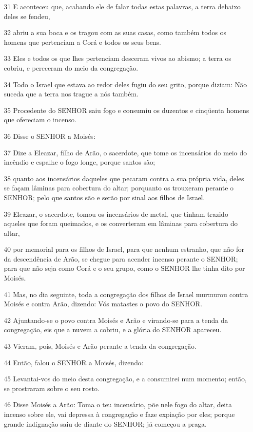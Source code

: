 \par 31 E aconteceu que, acabando ele de falar todas estas palavras, a terra debaixo deles se fendeu,
\par 32 abriu a sua boca e os tragou com as suas casas, como também todos os homens que pertenciam a Corá e todos os seus bens.
\par 33 Eles e todos os que lhes pertenciam desceram vivos ao abismo; a terra os cobriu, e pereceram do meio da congregação.
\par 34 Todo o Israel que estava ao redor deles fugiu do seu grito, porque diziam: Não suceda que a terra nos trague a nós também.
\par 35 Procedente do SENHOR saiu fogo e consumiu os duzentos e cinqüenta homens que ofereciam o incenso.
\par 36 Disse o SENHOR a Moisés:
\par 37 Dize a Eleazar, filho de Arão, o sacerdote, que tome os incensários do meio do incêndio e espalhe o fogo longe, porque santos são;
\par 38 quanto aos incensários daqueles que pecaram contra a sua própria vida, deles se façam lâminas para cobertura do altar; porquanto os trouxeram perante o SENHOR; pelo que santos são e serão por sinal aos filhos de Israel.
\par 39 Eleazar, o sacerdote, tomou os incensários de metal, que tinham trazido aqueles que foram queimados, e os converteram em lâminas para cobertura do altar,
\par 40 por memorial para os filhos de Israel, para que nenhum estranho, que não for da descendência de Arão, se chegue para acender incenso perante o SENHOR; para que não seja como Corá e o seu grupo, como o SENHOR lhe tinha dito por Moisés.
\par 41 Mas, no dia seguinte, toda a congregação dos filhos de Israel murmurou contra Moisés e contra Arão, dizendo: Vós matastes o povo do SENHOR.
\par 42 Ajuntando-se o povo contra Moisés e Arão e virando-se para a tenda da congregação, eis que a nuvem a cobriu, e a glória do SENHOR apareceu.
\par 43 Vieram, pois, Moisés e Arão perante a tenda da congregação.
\par 44 Então, falou o SENHOR a Moisés, dizendo:
\par 45 Levantai-vos do meio desta congregação, e a consumirei num momento; então, se prostraram sobre o seu rosto.
\par 46 Disse Moisés a Arão: Toma o teu incensário, põe nele fogo do altar, deita incenso sobre ele, vai depressa à congregação e faze expiação por eles; porque grande indignação saiu de diante do SENHOR; já começou a praga.
